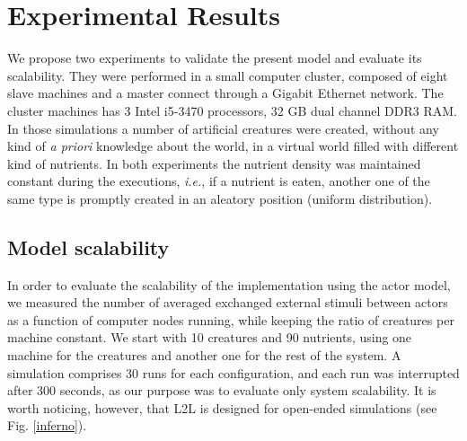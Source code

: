 \documentclass[runningheads]{llncs}
\begin{document}
\section{Experimental Results}
\label{sec:results}

We propose two experiments to validate the present model and evaluate its scalability. They were performed in a small computer cluster, composed of eight slave machines and a master connect through a Gigabit Ethernet network. The cluster machines has 3 Intel i5-3470 processors, 32 GB dual channel DDR3 RAM. In those simulations a number of artificial creatures were created, without any kind of \textit{a priori} knowledge about the world, in a virtual world filled with different kind of nutrients. In both experiments the nutrient density was maintained constant during the executions, \textit{i.e.},  if a nutrient is eaten, another one of the same type is promptly created in an aleatory position (uniform distribution). 

\subsection{Model scalability}

In order to evaluate the scalability of the implementation using the actor model, we measured the number of averaged exchanged external stimuli between actors as a function of computer nodes running, while keeping the ratio of creatures per machine constant. We start with 10 creatures and 90 nutrients, using one machine for the creatures and another one for the rest of the system. A simulation comprises 30 runs for each configuration, and each run was interrupted after 300 seconds, as our purpose was to evaluate only system scalability. It is worth noticing, however, that L2L is designed for open-ended simulations (see  Fig. \ref{inferno}). 
\end{document}
